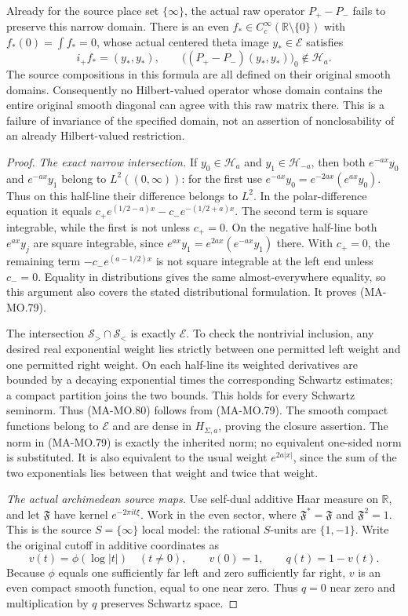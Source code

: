 Already for the source place set \(\{\infty\}\), the actual raw
operator \(P_+-P_-\) fails to preserve this narrow domain. There is
an even \(f_*\in C_c^\infty(\mathbb R\setminus\{0\})\) with
\(f_*(0)=\int f_*=0\), whose actual centered theta image
\(y_*\in\mathcal E\) satisfies
\[
 i_+f_*=(y_*,y_*),\qquad
 \bigl((P_+-P_-)(y_*,y_*)\bigr)_0\notin\mathcal H_a.
 \tag{MA-MO.81}
\]
The source compositions in this formula are all defined on their
original smooth domains. Consequently no Hilbert-valued operator
whose domain contains the entire original smooth diagonal can agree
with this raw matrix there. This is a failure of invariance of the
specified domain, not an assertion of nonclosability of an already
Hilbert-valued restriction.

\begin{proof}
\emph{The exact narrow intersection.}
If \(y_0\in\mathcal H_a\) and \(y_1\in\mathcal H_{-a}\), then
both \(e^{-ax}y_0\) and \(e^{-ax}y_1\) belong to
\(L^2((0,\infty))\): for the first use
\(e^{-ax}y_0=e^{-2ax}(e^{ax}y_0)\). Thus on this half-line
their difference belongs to \(L^2\). In the polar-difference
equation it equals
\(c_+e^{(1/2-a)x}-c_-e^{-(1/2+a)x}\). The second term
is square integrable, while the first is not unless \(c_+=0\).
On the negative half-line both \(e^{ax}y_j\) are square
integrable, since \(e^{ax}y_1=e^{2ax}(e^{-ax}y_1)\) there.
With \(c_+=0\), the remaining term
\(-c_-e^{(a-1/2)x}\) is not square integrable at the left
end unless \(c_-=0\). Equality in distributions gives the
same almost-everywhere equality, so this argument also covers
the stated distributional formulation. It proves (MA-MO.79).

The intersection \(\mathcal S_>\cap\mathcal S_<\) is exactly
\(\mathcal E\). To check the nontrivial inclusion, any desired
real exponential weight lies strictly between one permitted
left weight and one permitted right weight. On each half-line
its weighted derivatives are bounded by a decaying exponential
times the corresponding Schwartz estimates; a compact partition
joins the two bounds. This holds for every Schwartz seminorm.
Thus (MA-MO.80) follows from (MA-MO.79). The smooth compact
functions belong to \(\mathcal E\) and are dense in
\(H_{\Sigma,a}\), proving the closure assertion. The norm in
(MA-MO.79) is exactly the inherited norm; no equivalent
one-sided norm is substituted. It is also equivalent to the
usual weight \(e^{2a|x|}\), since the sum of the two
exponentials lies between that weight and twice that weight.

\emph{The actual archimedean source maps.}
Use self-dual additive Haar measure on \(\mathbb R\), and let
\(\mathfrak F\) have kernel \(e^{-2\pi it\xi}\). Work in the
even sector, where \(\mathfrak F^*=\mathfrak F\) and
\(\mathfrak F^2=1\). This is the source \(S=\{\infty\}\)
local model: the rational \(S\)-units are \(\{1,-1\}\).
Write the original cutoff in additive coordinates as
\[
 v(t)=\phi(\log|t|)\quad(t\ne0),\qquad v(0)=1,
                         \qquad q(t)=1-v(t).
 \tag{MA-MO.82}
\]
Because \(\phi\) equals one sufficiently far left and zero
sufficiently far right, \(v\) is an even compact smooth
function, equal to one near zero. Thus \(q=0\) near zero
and multiplication by \(q\) preserves Schwartz space.


\end{proof}
